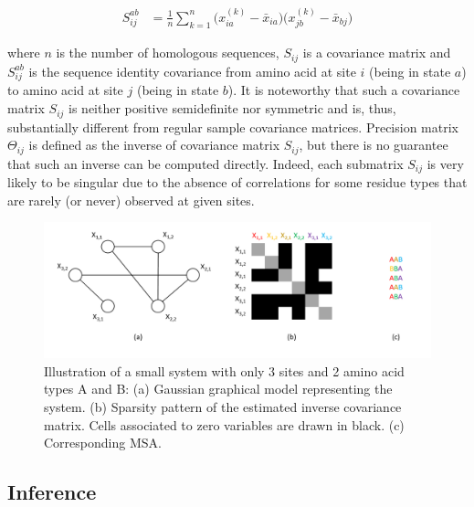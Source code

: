         \begin{equation} \label{covariance}
            \begin{split}
                S_{ij}^{ab} & = \frac{1}{n} \sum\limits_{k=1}^{n} \big( x_{ia}^{(k)} - \bar{x}_{ia} \big) \big( x_{jb}^{(k)} - \bar{x}_{bj} \big)
            \end{split}
        \end{equation}

        where $n$ is the number of
        homologous sequences, $S_{ij}$ is a covariance matrix and $S_{ij}^{ab}$ is the sequence
        identity covariance from amino acid
        at site $i$ (being in state $a$) to amino acid at site $j$ (being in state $b$).
        It is noteworthy that such a covariance matrix $S_{ij}$ is neither positive
        semidefinite nor symmetric and is, thus, substantially different from regular sample covariance matrices.
        Precision matrix $\Theta_{ij}$ is defined as
        the inverse of covariance matrix $S_{ij}$, but there is no guarantee that such an inverse can be computed directly.
        Indeed, each submatrix $S_{ij}$ is very likely to be singular due to the absence
        of correlations for some residue types that are rarely (or never) observed at given sites.

        \begin{figure}[H]
            \begin{center}
                \includegraphics[width=\textwidth, keepaspectratio]{imgs/ggm.png}
                \caption{Illustration of a small system with only 3 sites and 2 amino acid types A and B:
                    (a) Gaussian graphical model representing the system.
                    (b) Sparsity pattern of the estimated inverse covariance matrix.
                    Cells associated to zero variables are drawn in black. (c) Corresponding MSA.}
                \label{thresholds}
            \end{center}
        \end{figure}

    \subsection{Inference}

